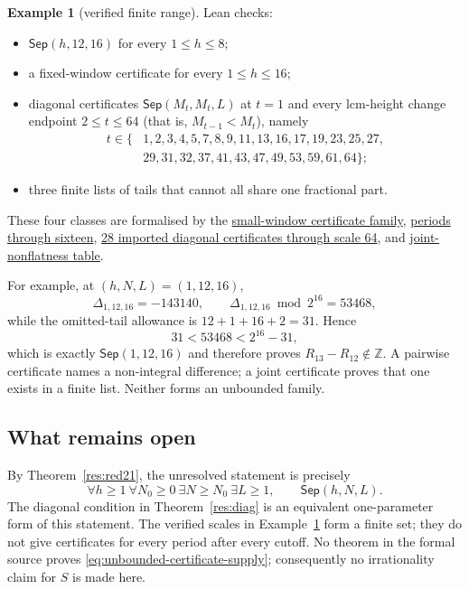 \documentclass[11pt]{article}
\newcommand{\commit}{ebc98ee71f6819bd9fe344a0bb343542c604e533}
\newcommand{\repobase}{https://github.com/wcook04/plectis-lean-erdos249-257/blob/\commit}
\newcommand{\PK}{Erdos249257}
\newcommand{\lword}[4]{\href{\repobase/\PK/#1\#L#2}{#4}}
\theoremstyle{definition}
\newtheorem{example}[theorem]{Example}
\theoremstyle{remark}
\newcommand{\Z}{\mathbb{Z}}
\begin{document}
\begin{example}[verified finite range]\label{res:deposits}
Lean checks:
\begin{itemize}[leftmargin=1.4em]
\item $\mathsf{Sep}(h,12,16)$ for every $1\le h\le8$;
\item a fixed-window certificate for every $1\le h\le16$;
\item diagonal certificates $\mathsf{Sep}(M_t,M_t,L)$ at $t=1$ and every
lcm-height change endpoint $2\le t\le64$ (that is, $M_{t-1}<M_t$), namely
\[
\begin{aligned}
t\in\{&1,2,3,4,5,7,8,9,11,13,16,17,19,23,25,27,\\
      &29,31,32,37,41,43,47,49,53,59,61,64\};
\end{aligned}
\]
\item three finite lists of tails that cannot all share one fractional part.
\end{itemize}
\end{example}
\noindent These four classes are formalised by the
\lword{TotientTailPeriodKiller.lean}{404}{certifiedKill_all_small}{small-window certificate family},
\lword{CarrySurvivorExtinction.lean}{574}{certifiedKill_all_upto_sixteen}{periods through sixteen},
\lword{DiagonalPincerCertificatesT64.lean}{1967}{certifiedKill_diagonal_all_imported_through_t64}{28 imported diagonal certificates through scale 64},
and
\lword{LcmConeNonflat.lean}{506}{coneNonflatCert_cells}{joint-nonflatness table}.

For example, at $(h,N,L)=(1,12,16)$,
\[
\Delta_{1,12,16}=-143140,\qquad
\Delta_{1,12,16}\bmod 2^{16}=53468,
\]
while the omitted-tail allowance is $12+1+16+2=31$.  Hence
\[
31<53468<2^{16}-31,
\]
which is exactly $\mathsf{Sep}(1,12,16)$ and therefore proves
$R_{13}-R_{12}\notin\Z$.  A pairwise certificate names a non-integral
difference; a joint certificate proves that one exists in a finite list.
Neither forms an unbounded family.

\subsection{What remains open}\label{sec:249-open}

By Theorem~\ref{res:red21}, the unresolved statement is precisely
\[
\forall h\ge1\ \forall N_0\ge0\ \exists N\ge N_0\ \exists L\ge1,\qquad
\mathsf{Sep}(h,N,L).
\tag{5.1}\label{eq:unbounded-certificate-supply}
\]
The diagonal condition in Theorem~\ref{res:diag} is an equivalent
one-parameter form of this statement.  The verified scales in
Example~\ref{res:deposits} form a finite set; they do not give certificates
for every period after every cutoff.  No theorem in the formal source proves
\eqref{eq:unbounded-certificate-supply}; consequently no irrationality claim
for $S$ is made here.
\end{document}
